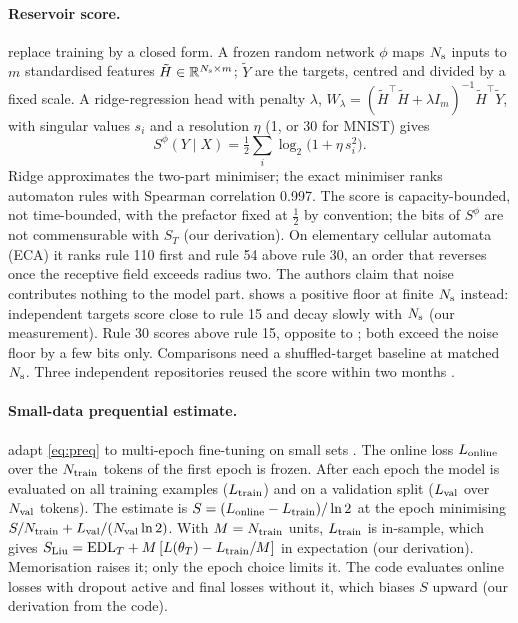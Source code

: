 \documentclass[11pt]{article}
\theoremstyle{tight}
\begin{document}
\paragraph{Reservoir score.} \citet{zhang2026learnablenovelty} replace training by a closed form. A
frozen random network $\phi$ maps $N_{\rm s}$ inputs to $m$ standardised features $\tilde
H\in\mathbb{R}^{N_{\rm s}\times m}$; $\tilde Y$ are the targets, centred and divided by a fixed scale. A
ridge-regression head with penalty $\lambda$, $W_\lambda=(\tilde H^\top\tilde H+\lambda I_m)^{-1}\tilde
H^\top\tilde Y$, with singular values $s_i$ and a resolution $\eta$ (1, or 30 for MNIST) gives
\begin{equation}\label{eq:zl}
S^\phi(Y\mid X)=\tfrac12\sum_i\log_2\bigl(1+\eta\,s_i^2\bigr).
\end{equation}
Ridge approximates the two-part minimiser; the exact minimiser ranks automaton rules with Spearman
correlation 0.997. The score is capacity-bounded, not time-bounded, with the prefactor fixed at
$\frac12$ by convention; the bits of $S^\phi$ are not commensurable with $S_T$ (our derivation). On elementary
cellular automata (ECA) it ranks rule 110 first and rule 54 above rule 30, an order that reverses once
the receptive field exceeds radius two. The authors claim that noise contributes nothing to the model
part.  shows a positive floor at finite $N_{\rm s}$ instead: independent targets score
close to rule 15 and decay slowly with $N_{\rm s}$ (our measurement). Rule 30 scores above rule 15,
opposite to \citet{finzi2026epiplexity}; both exceed the noise floor by a few bits only. Comparisons
need a shuffled-target baseline at matched $N_{\rm s}$. Three independent repositories reused the score within two months
\citep{lcrhepiplexity,epijepa,eberlful}.

\paragraph{Small-data prequential estimate.} \citet{liu2026selfplay} adapt \eqref{eq:preq} to
multi-epoch fine-tuning on small sets \citep{selfplaycode}. The online loss $L_{\rm online}$ over the
$N_{\rm train}$ tokens of the first epoch is frozen. After each epoch the model is evaluated on all
training examples ($L_{\rm train}$) and on a validation split ($L_{\rm val}$ over $N_{\rm val}$ tokens).
The estimate is $S=(L_{\rm online}-L_{\rm train})/\ln2$ at the epoch minimising $S/N_{\rm train}+L_{\rm
val}/(N_{\rm val}\ln2)$. With $M=N_{\rm train}$ units, $L_{\rm train}$ is in-sample, which gives
$S_{\rm Liu}=\mathrm{EDL}_T+M\,[L(\theta_T)-L_{\rm train}/M]$ in expectation (our derivation).
Memorisation raises it; only the epoch choice limits it. The code
evaluates online losses with dropout active and final losses without it, which biases $S$ upward (our
derivation from the code).
\end{document}
